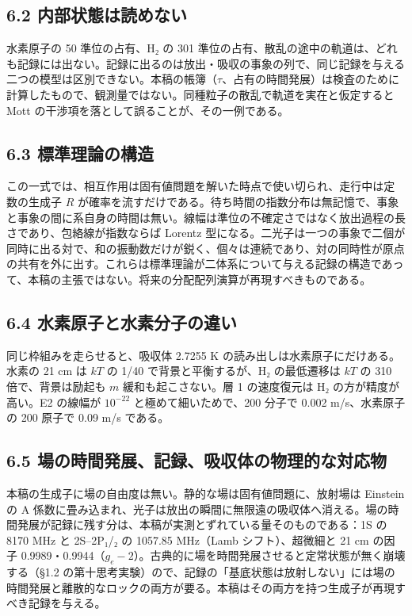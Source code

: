 \documentclass[
  a4paper,
]{ltjsarticle}
\begin{document}
\subsection{6.2
内部状態は読めない}\label{ux5185ux90e8ux72b6ux614bux306fux8aadux3081ux306aux3044}

水素原子の 50 準位の占有、H₂ の 301
準位の占有、散乱の途中の軌道は、どれも記録には出ない。記録に出るのは放出・吸収の事象の列で、同じ記録を与える二つの模型は区別できない。本稿の帳簿（\(\tau\)、占有の時間発展）は検査のために計算したもので、観測量ではない。同種粒子の散乱で軌道を実在と仮定すると
Mott の干渉項を落として誤ることが、その一例である。

\subsection{6.3
標準理論の構造}\label{ux6a19ux6e96ux7406ux8ad6ux306eux69cbux9020}

この一式では、相互作用は固有値問題を解いた時点で使い切られ、走行中は定数の生成子
\(R\)
が確率を流すだけである。待ち時間の指数分布は無記憶で、事象と事象の間に系自身の時間は無い。線幅は準位の不確定さではなく放出過程の長さであり、包絡線が指数ならば
Lorentz
型になる。二光子は一つの事象で二個が同時に出る対で、和の振動数だけが鋭く、個々は連続であり、対の同時性が原点の共有を外に出す。これらは標準理論が二体系について与える記録の構造であって、本稿の主張ではない。将来の分配配列演算が再現すべきものである。

\subsection{6.4
水素原子と水素分子の違い}\label{ux6c34ux7d20ux539fux5b50ux3068ux6c34ux7d20ux5206ux5b50ux306eux9055ux3044}

同じ枠組みを走らせると、吸収体 2.7255 K
の読み出しは水素原子にだけある。水素の 21 cm は \(kT\) の 1/40
で背景と平衡するが、H₂ の最低遷移は \(kT\) の 310 倍で、背景は励起も
\(m\) 緩和も起こさない。層 1 の速度復元は H₂ の方が精度が高い。E2
の線幅が \(10^{-22}\) と極めて細いためで、200 分子で 0.002
m/s、水素原子の 200 原子で 0.09 m/s である。

\subsection{6.5
場の時間発展、記録、吸収体の物理的な対応物}\label{ux5834ux306eux6642ux9593ux767aux5c55ux8a18ux9332ux5438ux53ceux4f53ux306eux7269ux7406ux7684ux306aux5bfeux5fdcux7269}

本稿の生成子に場の自由度は無い。静的な場は固有値問題に、放射場は
Einstein の A
係数に畳み込まれ、光子は放出の瞬間に無限遠の吸収体へ消える。場の時間発展が記録に残す分は、本稿が実測とずれている量そのものである：1S
の 8170 MHz と 2S--2P₁/₂ の 1057.85 MHz（Lamb シフト）、超微細と 21 cm
の因子
0.9989・0.9944（\(g_e-2\)）。古典的に場を時間発展させると定常状態が無く崩壊する（§1.2
の第十思考実験）ので、記録の「基底状態は放射しない」には場の時間発展と離散的なロックの両方が要る。本稿はその両方を持つ生成子が再現すべき記録を与える。
\end{document}
